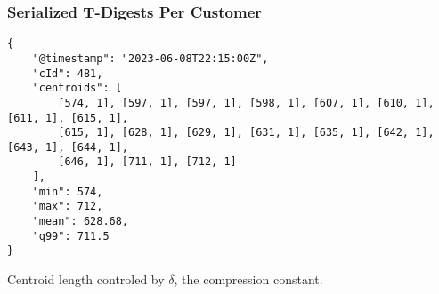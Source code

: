 \begin{frame}[fragile]
    \frametitle{Serialized T-Digests Per Customer}

\begin{lstlisting}
{
    "@timestamp": "2023-06-08T22:15:00Z",
    "cId": 481,
    "centroids": [
        [574, 1], [597, 1], [597, 1], [598, 1], [607, 1], [610, 1], [611, 1], [615, 1],
        [615, 1], [628, 1], [629, 1], [631, 1], [635, 1], [642, 1], [643, 1], [644, 1],
        [646, 1], [711, 1], [712, 1]
    ],
    "min": 574,
    "max": 712,
    "mean": 628.68,
    "q99": 711.5
}
\end{lstlisting}

Centroid length controled by $\delta$, the compression constant.
\end{frame}
